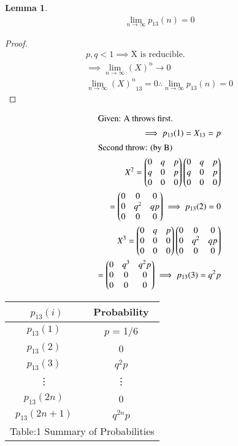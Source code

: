 \documentclass[journal,12pt,twocolumn]{IEEEtran}
\theoremstyle{definition}
\newtheorem{lemma}[theorem]{Lemma}
\newcommand{\myvec}[1]{\ensuremath{\begin{pmatrix}#1\end{pmatrix}}}
\numberwithin{equation}{subsection}
\begin{document}
\begin{lemma} \large
    \begin{align*}
        \lim_{n \to \infty}p_{13}(n) = 0
    \end{align*}
\end{lemma}
\begin{proof}
   \begin{align*}
      p , q < 1
      \implies \text{X is reducible.}\\
     \implies \lim_{n \to \infty} (X)^n \to 0\label{Eqn:2.1}\\
         \lim_{n \to \infty}{(X)^n}_{13} = 0
         \therefore \lim_{n \to \infty} p_{13}(n) = 0
    \end{align*}
\end{proof}
\begin{align*}
    \intertext{Given: A throws first.}
    \implies p_{13}(1) = X_{13} = p\\ 
    \intertext{Second throw: (by B)}
    X^2 = \myvec{0 & q & p\\ q & 0 & p\\ 0 & 0 & 0} \myvec{0 & q & p\\ q & 0 & p\\ 0 & 0 & 0}\\
    = \myvec{ 0 & 0 & 0\\0 & q^2 & qp\\0 & 0 & 0}
    \implies  p_{13}(2) = 0\\
    X^3 = \myvec{ 0 & q & p\\0 & 0 & 0\\0 & 0 & 0}\myvec{ 0 & 0 & 0\\0 & q^2 & qp\\0 & 0 & 0}\\
    =\myvec{ 0 & q^3 & q^2p\\0 & 0 & 0\\0 & 0 & 0}
    \implies  p_{13}(3) = q^2 p
\end{align*}
\centering \begin{tabular}{|c|c|}
    \hline\
    $p_{13}(i)$ & Probability \\
    \hline
    $p_{13}(1)$ & $p$ = 1/6\\
    \hline
    $p_{13}(2)$ & 0\\
    \hline
    $p_{13}(3)$ & $q^2p$\\
    \hline
    \vdots & \vdots\\
    $p_{13}(2n)$ & 0\\
    \hline
    $p_{13}(2n + 1)$ & $q^{2n}p$\\
    \hline
    \multicolumn{2}{c}{Table:1 Summary of Probabilities}\\
\end{tabular}
\end{document}
